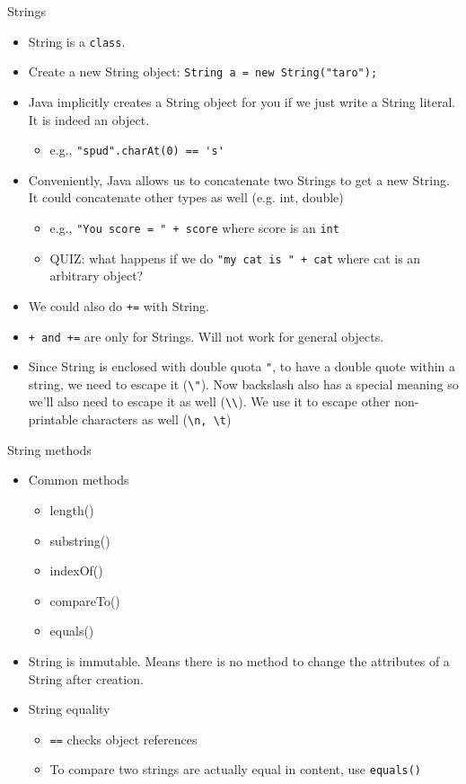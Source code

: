 \documentclass[aspectratio=169]{beamer}
\begin{document}
\begin{frame}[fragile]{Strings}
  \begin{itemize}
    \item String is a \verb|class|.
    \item Create a new String object: \verb|String a = new String("taro");|
    \item Java implicitly creates a String object for you if we just write a String literal. It is indeed an object.
      \begin{itemize}
        \item e.g., \verb|"spud".charAt(0) == 's'|
      \end{itemize}
    \item Conveniently, Java allows us to concatenate two Strings to get a new String. It could concatenate other types as well (e.g. int, double)
      \begin{itemize}
        \item e.g., \verb|"You score = " + score| where score is an \verb|int|
        \item \alert{QUIZ:} what happens if we do \verb|"my cat is " + cat| where cat is an arbitrary object?
      \end{itemize}
    \item We could also do \verb|+=| with String.
    \item \verb|+ and +=| are only for Strings. Will not work for general objects.
    \item Since String is enclosed with double quota \verb|"|, to have a double quote within a string, we need to escape it (\verb|\"|). Now backslash also
      has a special meaning so we'll also need to escape it as well (\verb|\\|). We use it to escape other non-printable characters as well (\verb|\n, \t|)
  \end{itemize}
\end{frame}

\begin{frame}[fragile]{String methods}
  \begin{itemize}
    \item Common methods
      \begin{itemize}
        \item length()
        \item substring()
        \item indexOf()
        \item compareTo()
        \item equals()
      \end{itemize}
    \item String is immutable. Means there is no method to change the attributes of a String after creation.
    \item String equality
    \begin{itemize}
      \item \verb|==| checks object references
      \item To compare two strings are actually equal in content, use \verb|equals()|
    \end{itemize}
  \end{itemize}
\end{frame}
\end{document}
